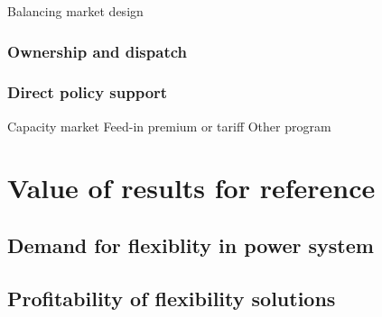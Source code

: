 Balancing market design \cite{Wartsila2014} \cite{Moller2010}

\subsubsection{Ownership and dispatch}

\subsubsection{Direct policy support}
Capacity market
Feed-in premium or tariff
Other program

\section{Value of results for reference}
\subsection{Demand for flexiblity in power system}

\subsection{Profitability of flexibility solutions}
